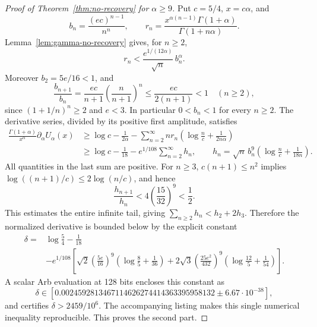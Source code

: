 \documentclass[11pt,a4paper]{article}
\theoremstyle{plain}
\theoremstyle{remark}
\begin{document}
\begin{proof}[Proof of Theorem~\ref{thm:no-recovery} for $\alpha\ge9$]
Put $c=5/4$, $x=c\alpha$, and
\[
 b_n=\frac{(ec)^{n-1}}{n^n},\qquad
 r_n=\frac{x^{\alpha(n-1)}\Gamma(1+\alpha)}{
                    \Gamma(1+n\alpha)}.
\]
Lemma~\ref{lem:gamma-no-recovery} gives, for $n\ge2$,
\[
 r_n<\frac{e^{1/(12\alpha)}}{\sqrt n}\,b_n^\alpha.
\]
Moreover $b_2=5e/16<1$, and
\[
 \frac{b_{n+1}}{b_n}
 =\frac{ec}{n+1}\left(\frac{n}{n+1}\right)^n
 \le \frac{ec}{2(n+1)}<1
 \quad(n\ge2),
\]
since $(1+1/n)^n\ge2$ and $e<3$.
In particular $0<b_n<1$ for every $n\ge2$.
The derivative series, divided by its positive first amplitude, satisfies
\begin{align*}
 \frac{\Gamma(1+\alpha)}{x^\alpha}\partial_\alpha U_\alpha(x)
 &\ge \log c-\frac1{2\alpha}
 -\sum_{n=2}^\infty n r_n
       \left(\log\frac n c+\frac1{2n\alpha}\right)\\
 &\ge\log c-\frac1{18}-e^{1/108}\sum_{n=2}^\infty h_n,
 \qquad
 h_n=\sqrt n\,b_n^9
           \left(\log\frac n c+\frac1{18n}\right).
\end{align*}
All quantities in the last sum are positive. For $n\ge3$,
$c(n+1)\le n^2$ implies
$\log((n+1)/c)\le2\log(n/c)$, and hence
\[
 \frac{h_{n+1}}{h_n}
 <4\left(\frac{15}{32}\right)^9<\frac12.
\]
This estimates the entire infinite tail, giving
$\sum_{n\ge2}h_n<h_2+2h_3$. Therefore the normalized derivative is
bounded below by the explicit constant
\begin{align*}
 \delta={}&\log\frac54-\frac1{18}\\
 &-e^{1/108}\left[
 \sqrt2\left(\frac{5e}{16}\right)^9
        \left(\log\frac85+\frac1{36}\right)
 +2\sqrt3\left(\frac{25e^2}{432}\right)^9
        \left(\log\frac{12}5+\frac1{54}\right)\right].
\end{align*}
A scalar Arb evaluation at 128 bits encloses this constant as
\[
 \delta\in[0.0024592813467114626274414363395958132
                  \mathbin{\pm}6.67\cdot10^{-38}],
\]
and certifies $\delta>2459/10^6$. The accompanying listing makes this
single numerical inequality reproducible. This proves the second part.
\end{proof}
\end{document}
